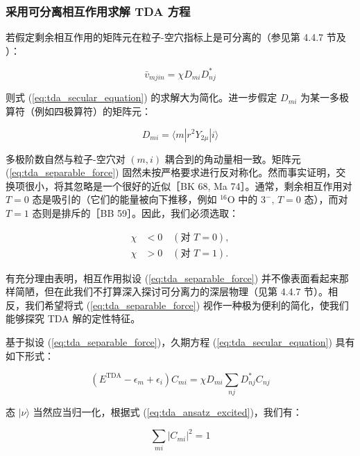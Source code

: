 \subsubsection{采用可分离相互作用求解 TDA 方程}

若假定剩余相互作用的矩阵元在粒子-空穴指标上是可分离的（参见第 4.4.7 节及 \cite{BB59,BET61}）：

\begin{equation}
\bar{v}_{mjin}=\chi D_{mi}D^{*}_{nj}\label{eq:tda_separable_force}
\end{equation}

则式 (\ref{eq:tda_secular_equation}) 的求解大为简化。进一步假定 $D_{mi}$ 为某一多极算符（例如四极算符）的矩阵元：

\begin{equation}
D_{mi}=\langle m|r^{2}Y_{2\mu}|i\rangle\label{eq:tda_multipole_element}
\end{equation}

多极阶数自然与粒子-空穴对 $(m,i)$ 耦合到的角动量相一致。矩阵元 (\ref{eq:tda_separable_force})
固然未按严格要求进行反对称化。然而事实证明，交换项很小，将其忽略是一个很好的近似［BK 68, Ma 74］。通常，剩余相互作用对
$T=0$ 态是吸引的（它们的能量被向下推移，例如 $^{16}\mathrm{O}$ 中的 $3^{-},\,T=0$ 态），而对
$T=1$ 态则是排斥的［BB 59］。因此，我们必须选取：

\begin{align}
\chi & <0\quad(\text{对 }T=0),\nonumber \\
\chi & >0\quad(\text{对 }T=1).\label{eq:tda_coupling_sign}
\end{align}

有充分理由表明，相互作用拟设 (\ref{eq:tda_separable_force}) 并不像表面看起来那样简陋，但在此我们不打算深入探讨可分离力的深层物理（见第
4.4.7 节）。相反，我们希望将式 (\ref{eq:tda_separable_force}) 视作一种极为便利的简化，使我们能够探究
TDA 解的定性特征。

基于拟设 (\ref{eq:tda_separable_force})，久期方程 (\ref{eq:tda_secular_equation})
具有如下形式：

\begin{equation}
(E^{\text{TDA}}-\epsilon_{m}+\epsilon_{i})C_{mi}=\chi D_{mi}\sum_{nj}D^{*}_{nj}C_{nj}\label{eq:tda_separable_secular}
\end{equation}

态 $|\nu\rangle$ 当然应当归一化，根据式 (\ref{eq:tda_ansatz_excited})，我们有：

\begin{equation}
\sum_{mi}|C_{mi}|^{2}=1\label{eq:tda_normalization}
\end{equation}

